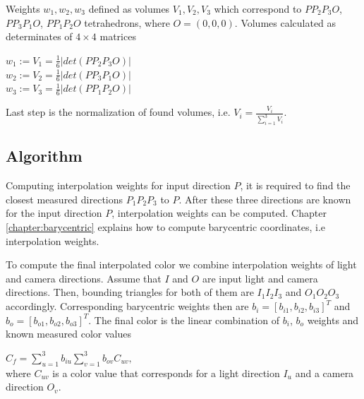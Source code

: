 Weights  $w_{1},w_{2},w_{3}$ defined as volumes $V_{1},V_{2},V_{3}$ which correspond to $PP_{2}P_{3}O$, $PP_{3}P_{1}O$, $PP_{1}P_{2}O$ tetrahedrons, where $O=(0,0,0)$.
 Volumes calculated as determinates of $4\times 4$ matrices

{\centering $w_{1}:=V_{1}=\frac{1}{6}\left | det(PP_{2}P_{3}O) \right |$ \\}
{\centering $w_{2}:=V_{2}=\frac{1}{6}\left | det(PP_{3}P_{1}O) \right |$ \\}
{\centering $w_{3}:=V_{3}=\frac{1}{6}\left | det(PP_{1}P_{2}O) \right |$ \\}

Last step is the normalization of found volumes, i.e. $V_{i}=\frac{V_{i}}{\sum_{i=1}^{3}V_{i}}$.


\subsection{Algorithm}
\label{chapter:interp_algo}

Computing interpolation weights for input direction $P$, it is required to find the closest measured directions $P_{1}P_{2}P_{3}$ to $P$.
After these three directions are known for the input direction $P$, interpolation weights can be computed.
 Chapter \ref{chapter:barycentric} explains how to compute barycentric coordinates, i.e interpolation weights.
  
To compute the final interpolated color we combine interpolation weights of light and camera directions.
Assume that $I$ and $O$ are input light and camera directions. 
Then, bounding triangles for both of them are $I_{1}I_{2}I_{3}$ and $O_{1}O_{2}O_{3}$ accordingly.
Corresponding barycentric weights then are $b_{i}=[b_{i1},b_{i2},b_{i3}]^T$ and $b_{o}=[b_{o1},b_{o2},b_{o3}]^T$.
The final color is the linear combination of $b_{i}$, $b_{o}$ weights and known measured color values 

 {\centering $ C_{f}=\sum_{u=1}^{3}b_{iu}\sum_{v=1}^{3}b_{ov}C_{uv},$\\} where $C_{uv}$ is a color value that corresponds for a light direction $I_{u}$ and a camera direction $O_{v}$.

